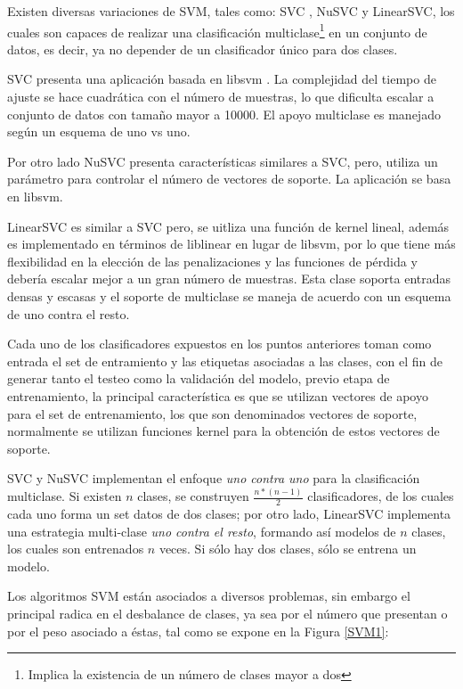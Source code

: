 Existen diversas variaciones de SVM, tales como: SVC \cite{guyon1993automatic}, NuSVC y LinearSVC, los cuales son capaces de realizar una clasificación multiclase\footnote{Implica la existencia de un número de clases mayor a dos} en un conjunto de datos, es decir, ya no depender de un clasificador único para dos clases.

SVC presenta una aplicación basada en libsvm \cite{chang2011libsvm}. La complejidad del tiempo de ajuste se hace cuadrática con el número de muestras, lo que dificulta escalar a conjunto de datos con tamaño mayor a 10000. El apoyo multiclase es manejado según un esquema de uno vs uno.

Por otro lado NuSVC presenta características similares a SVC, pero, utiliza un parámetro para controlar el número de vectores de soporte. La aplicación se basa en libsvm.

LinearSVC es similar a SVC pero, se uitliza una función de kernel lineal, además es implementado en términos de liblinear en lugar de libsvm, por lo que tiene más flexibilidad en la elección de las penalizaciones y las funciones de pérdida y debería escalar mejor a un gran número de muestras.
Esta clase soporta entradas densas y escasas y el soporte de multiclase se maneja de acuerdo con un
esquema de uno contra el resto.

Cada uno de los clasificadores expuestos en los puntos anteriores toman como entrada el set de entramiento y las etiquetas asociadas a las clases, con el fin de generar tanto el testeo como la validación del modelo, previo etapa de entrenamiento, la principal característica es que se utilizan vectores de apoyo para el set de entrenamiento, los que son denominados vectores de soporte, normalmente se utilizan funciones kernel para la obtención de estos vectores de soporte.

SVC y NuSVC implementan el enfoque \textit{uno contra uno} para la clasificación multiclase. Si existen $n$ clases, se construyen $\frac{n*(n-1)}{2}$ clasificadores, de los cuales cada uno forma un set datos de dos clases; por otro lado, LinearSVC implementa una estrategia multi-clase \textit{uno contra el resto}, formando así modelos de $n$ clases, los cuales son entrenados $n$ veces. Si sólo hay dos clases, sólo se entrena un modelo.

Los algoritmos SVM están asociados a diversos problemas, sin embargo el principal radica en el desbalance de clases, ya sea por el número que presentan o por el peso asociado a éstas, tal como se expone en la Figura  \ref{SVM1}:

